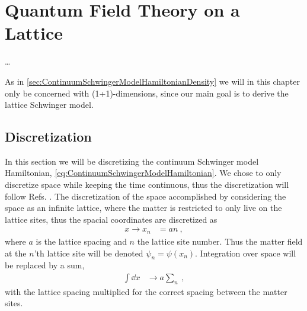 \documentclass[../main.tex]{subfiles} %
\begin{document}
\chapter{Quantum Field Theory on a Lattice} \label{chap:LatticeQFT}

\ldots
\lipsum[1-2]

As in \cref{sec:ContinuumSchwingerModelHamiltonianDensity} we will in this chapter only be concerned with (1+1)-dimensions, since our main goal is to derive the lattice Schwinger model.




\section{Discretization} \label{sec:Discretization}

In this section we will be discretizing the continuum Schwinger model Hamiltonian, \cref{eq:ContinuumSchwingerModelHamiltonian}. We chose to only discretize space while keeping the time continuous, thus the discretization will follow Refs. \cite{sriganish_PhD_LatticeSchwingerModel_2001, smit_introToQuantumFieldsOnALattice_2003}. The discretization of the space accomplished by considering the space as an infinite lattice, where the matter is restricted to only live on the lattice sites, thus the spacial coordinates are discretized as
\begin{align}
    x \rightarrow x_n &= an \: ,
\end{align}
where $a$ is the lattice spacing and $n$ the lattice site number. Thus the matter field at the $n$'th lattice site will be denoted $\psi_n = \psi(x_n)$. Integration over space will be replaced by a sum,
\begin{align}
    \int \dd{x} &\rightarrow a \sum_n \: ,
\end{align}
with the lattice spacing multiplied for the correct spacing between the matter sites.
\end{document}
